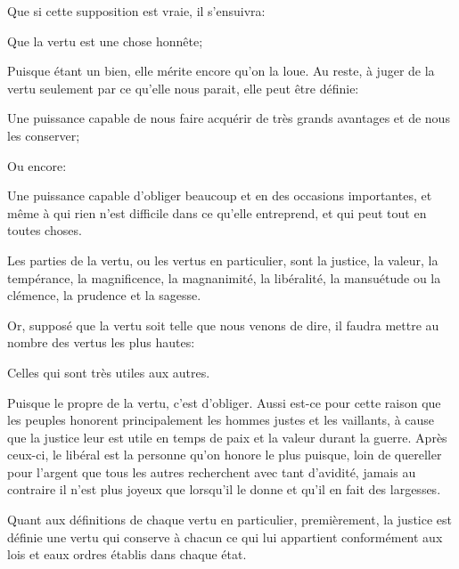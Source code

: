 Que si cette supposition est vraie, il s'ensuivra:

\begin{lieu}
	Que la vertu est une chose honnête;
\end{lieu}

Puisque étant un bien, elle mérite encore qu'on la loue. Au reste, à juger de la vertu seulement par ce qu'elle
nous parait, elle peut être définie:

\begin{emphpar}
	Une puissance capable de nous faire acquérir de très grands avantages et de nous les conserver;
\end{emphpar}

Ou encore:

\begin{emphpar}
	Une puissance capable d'obliger beaucoup et en des occasions importantes, et même à qui rien n'est difficile
	dans ce qu'elle entreprend, et qui peut tout en toutes choses.
\end{emphpar}

\bigbreak

Les parties de la vertu, ou les vertus en particulier, sont la justice, la valeur, la tempérance, la magnificence,
la magnanimité, la libéralité, la mansuétude ou la clémence, la prudence et la sagesse.

\bigbreak

Or, supposé que la vertu soit telle que nous venons de dire, il faudra mettre au nombre des vertus les plus hautes:

\begin{lieu}
	Celles qui sont très utiles aux autres.
\end{lieu}

Puisque le propre de la vertu, c'est d'obliger. Aussi est-ce pour cette raison que les peuples honorent
principalement les hommes justes et les vaillants, à cause que la justice leur est utile en temps de paix
et la valeur durant la guerre. Après ceux-ci, le libéral est la personne qu'on honore le plus puisque, loin
de quereller pour l'argent que tous les autres recherchent avec tant d'avidité, jamais au contraire il n'est
plus joyeux que lorsqu'il le donne et qu'il en fait des largesses.

\bigbreak

Quant aux définitions de chaque vertu en particulier, premièrement, la justice est définie une vertu qui
conserve à chacun ce qui lui appartient conformément aux lois et eaux ordres établis dans chaque état.

